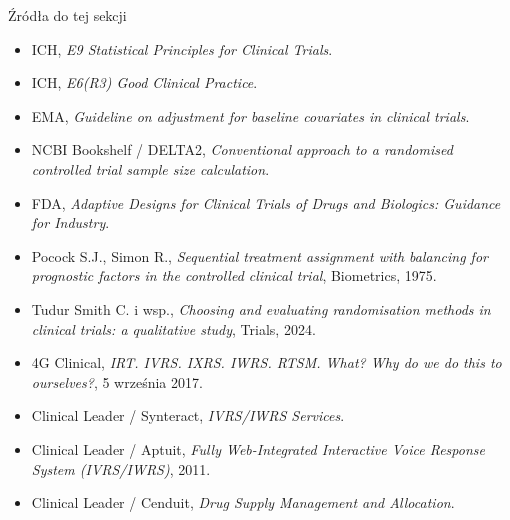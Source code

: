 \begin{frame}{Źródła do tej sekcji}
  \tiny
  \begin{itemize}
    \item ICH, \textit{E9 Statistical Principles for Clinical Trials}.
    \item ICH, \textit{E6(R3) Good Clinical Practice}.
    \item EMA, \textit{Guideline on adjustment for baseline covariates in clinical trials}.
    \item NCBI Bookshelf / DELTA2, \textit{Conventional approach to a randomised controlled trial sample size calculation}.
    \item FDA, \textit{Adaptive Designs for Clinical Trials of Drugs and Biologics: Guidance for Industry}.
    \item Pocock S.J., Simon R., \textit{Sequential treatment assignment with balancing for prognostic factors in the controlled clinical trial}, Biometrics, 1975.
    \item Tudur Smith C. i wsp., \textit{Choosing and evaluating randomisation methods in clinical trials: a qualitative study}, Trials, 2024.
    \item 4G Clinical, \textit{IRT. IVRS. IXRS. IWRS. RTSM. What? Why do we do this to ourselves?}, 5 września 2017.
    \item Clinical Leader / Synteract, \textit{IVRS/IWRS Services}.
    \item Clinical Leader / Aptuit, \textit{Fully Web-Integrated Interactive Voice Response System (IVRS/IWRS)}, 2011.
    \item Clinical Leader / Cenduit, \textit{Drug Supply Management and Allocation}.
  \end{itemize}
\end{frame}
